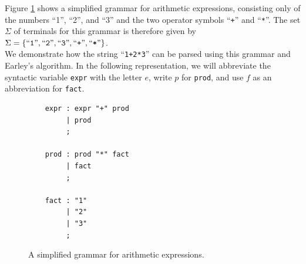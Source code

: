 \exampleEng
Figure \ref{fig:expr-small} shows a simplified grammar for arithmetic expressions, consisting only of the
numbers “1”, “2”, and “3” and the two operator symbols “\texttt{+}” and “\texttt{*}”. The set $\Sigma$ of terminals
for this grammar is therefore given by
\\[0.2cm]
\hspace*{1.3cm}
 $\Sigma = \{ \mbox{``\texttt{1}''}, \mbox{``\texttt{2}''}, \mbox{``\texttt{3}''}, \mbox{``\texttt{+}''}, \mbox{``\texttt{*}''} \}$.
\\[0.2cm]
We demonstrate how the string “\texttt{1+2*3}” can be parsed using this grammar and Earley’s algorithm. In the
following representation, we will abbreviate the syntactic variable \texttt{expr} with the letter $e$, write 
$p$ for \texttt{prod}, and use $f$ as an abbreviation for \texttt{fact}. 

\begin{figure}[!ht]
\centering
\begin{verbatim}
    expr : expr "+" prod
         | prod
         ;

    prod : prod "*" fact
         | fact
         ;

    fact : "1"
         | "2"
         | "3"
         ;
\end{verbatim}
\vspace*{-0.3cm}
  \caption{A simplified grammar for arithmetic expressions.}
  \label{fig:expr-small} 
\end{figure}


